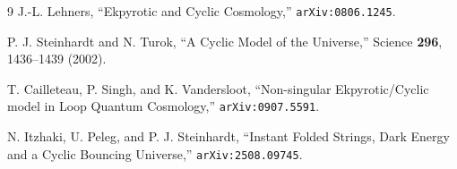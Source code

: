 \documentclass[11pt]{article}
\theoremstyle{remark}
\begin{document}
\begin{thebibliography}{9}
J.-L. Lehners,
``Ekpyrotic and Cyclic Cosmology,''
\texttt{arXiv:0806.1245}.

P. J. Steinhardt and N. Turok,
``A Cyclic Model of the Universe,''
Science \textbf{296}, 1436--1439 (2002).

T. Cailleteau, P. Singh, and K. Vandersloot,
``Non-singular Ekpyrotic/Cyclic model in Loop Quantum Cosmology,''
\texttt{arXiv:0907.5591}.

N. Itzhaki, U. Peleg, and P. J. Steinhardt,
``Instant Folded Strings, Dark Energy and a Cyclic Bouncing Universe,''
\texttt{arXiv:2508.09745}.
\end{thebibliography}
\end{document}
